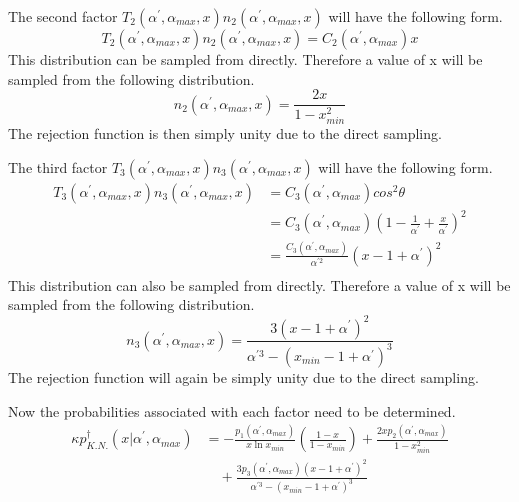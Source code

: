 The second factor $T_2(\alpha^{'},\alpha_{max},x)n_2(\alpha^{'},\alpha_{max},x)$
will have the following form.
\begin{equation*}
  T_2(\alpha^{'},\alpha_{max},x)n_2(\alpha^{'},\alpha_{max},x) = 
  C_2(\alpha^{'},\alpha_{max})x
\end{equation*}
This distribution can be sampled from directly. Therefore a value of x will
be sampled from the following distribution.
\begin{equation}
  n_2(\alpha^{'},\alpha_{max},x) = \frac{2x}{1-x_{min}^2}
\end{equation}
The rejection function is then simply unity due to the direct sampling.

The third factor $T_3(\alpha^{'},\alpha_{max},x)n_3(\alpha^{'},\alpha_{max},x)$
will have the following form.
\begin{align}
  T_3(\alpha^{'},\alpha_{max},x)n_3(\alpha^{'},\alpha_{max},x) & = 
  C_3(\alpha^{'},\alpha_{max})cos^2\theta \nonumber \\
  & = C_3(\alpha^{'},\alpha_{max})
  \left(1 - \frac{1}{\alpha^{'}} + \frac{x}{\alpha^{'}}\right)^2 \nonumber \\
  & = \frac{C_3(\alpha^{'},\alpha_{max})}{\alpha^{'2}}\left(x-1+\alpha^{'}\right)^2
  \nonumber \\
\end{align}
This distribution can also be sampled from directly. Therefore a value of x
will be sampled from the following distribution.
\begin{equation}
  n_3(\alpha^{'},\alpha_{max},x) = \frac{3\left(x-1+\alpha^{'}\right)^2}
  {\alpha^{'3} - \left(x_{min}-1+\alpha^{'}\right)^3}
\end{equation}
The rejection function will again be simply unity due to the direct sampling.

Now the probabilities associated with each factor need to be determined.
\begin{align}
  \kappa p_{K.N.}^{\dagger}(x|\alpha^{'},\alpha_{max}) & = 
  -\frac{p_1(\alpha^{'},\alpha_{max})}{x\ln{x_{min}}}
  \left(\frac{1-x}{1-x_{min}}\right) +
  \frac{2xp_2(\alpha^{'},\alpha_{max})}{1-x_{min}^2} \nonumber \\
  & \quad +
  \frac{3p_3(\alpha^{'},\alpha_{max})\left(x-1+\alpha^{'}\right)^2}
  {\alpha^{'3} - \left(x_{min}-1+\alpha^{'}\right)^3} \nonumber
\end{align}

